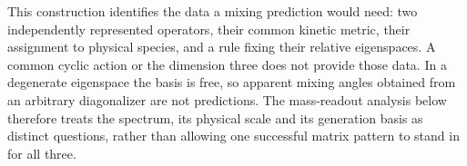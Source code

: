 This construction identifies the data a mixing prediction would need:
two independently represented operators, their common kinetic metric,
their assignment to physical species, and a rule fixing their relative
eigenspaces. A common cyclic action or the dimension three does not
provide those data. In a degenerate eigenspace the basis is free, so
apparent mixing angles obtained from an arbitrary diagonalizer are
not predictions. The mass-readout analysis below therefore treats
the spectrum, its physical scale and its generation basis as distinct
questions, rather than allowing one successful matrix pattern to
stand in for all three.
